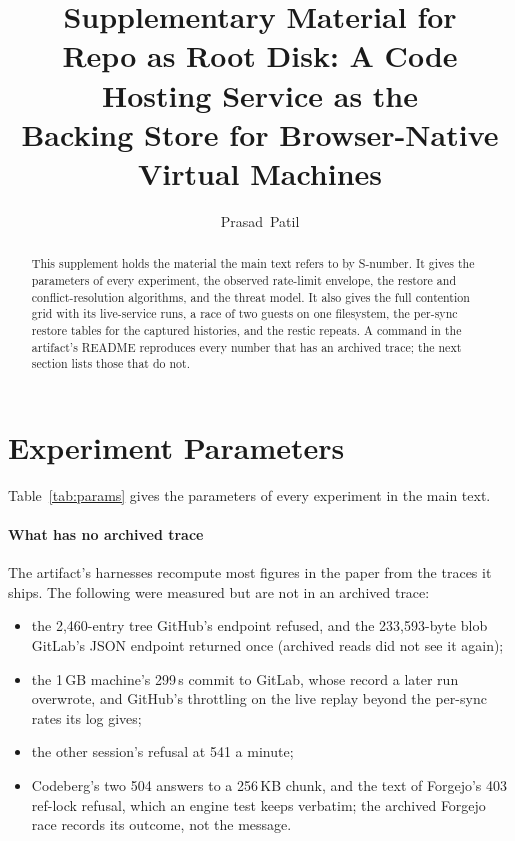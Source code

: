 \documentclass[journal,10pt]{IEEEtran}
\begin{document}
\title{Supplementary Material for\\
Repo as Root Disk: A Code Hosting Service as the\\
Backing Store for Browser-Native Virtual Machines}
\author{Prasad~Patil}
\maketitle

\begin{abstract}
This supplement holds the material the main text refers to by S-number. It
gives the parameters of every experiment, the observed rate-limit envelope, the
restore and conflict-resolution algorithms, and the threat model. It also gives
the full contention grid with its live-service runs, a race of two guests on
one filesystem, the per-sync restore
tables for the captured histories, and the restic repeats. A command in the
artifact's README reproduces every number that has an archived trace; the next
section lists those that do not.
\end{abstract}

\section{Experiment Parameters}
\label{sup:params}

Table~\ref{tab:params} gives the parameters of every experiment in the main text.

\paragraph{What has no archived trace} The artifact's harnesses recompute most
figures in the paper from the traces it ships. The following were measured but
are not in an archived trace:
\begin{itemize}\itemsep1pt
\item the 2,460-entry tree GitHub's endpoint refused, and the 233,593-byte blob
GitLab's JSON endpoint returned once (archived reads did not see it again);
\item the 1\,GB machine's 299\,s commit to GitLab, whose record a later run
overwrote, and GitHub's throttling on the live replay beyond the per-sync rates
its log gives;
\item the other session's refusal at 541 a minute;
\item Codeberg's two 504 answers to a 256\,KB chunk, and the text of Forgejo's
403 ref-lock refusal, which an engine test keeps verbatim; the archived Forgejo
race records its outcome, not the message.
\end{itemize}
\end{document}
